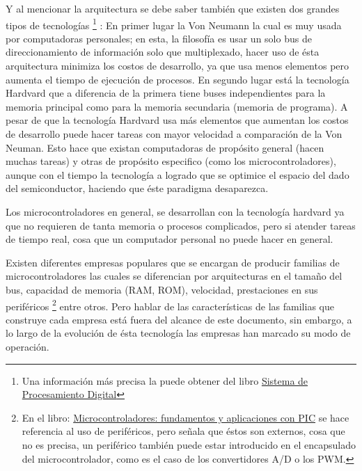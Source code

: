 \documentclass{article}
\begin{document}
Y al mencionar la arquitectura se debe saber también que existen dos
grandes tipos de tecnologías \footnote{Una información más precisa la puede
		obtener del libro \href{https://books.google.com.co/books?id=N7u2x4LyJ7UC\&pg=PA8\&dq=harvard+von+neumann\&hl=es-419\&sa=X\&ved=0ahUKEwjCrOKkus_LAhVCQSYKHVBGB8gQ6AEIHTAA\#v=onepage\&q=harvard\%20von\%20neumann\&f=false}{Sistema de Procesamiento Digital}} 
: En primer lugar la Von Neumann la cual es muy
usada por computadoras personales; en esta, la filosofía es usar un solo bus
de direccionamiento de información solo que multiplexado, hacer uso de ésta
arquitectura minimiza los costos de desarrollo, ya que usa menos elementos
pero aumenta el tiempo de ejecución de procesos. En segundo lugar está
la tecnología Hardvard que a diferencia de la primera tiene buses 
independientes para la memoria principal como para la memoria secundaria
(memoria de programa). A pesar de que la tecnología Hardvard usa más
elementos que aumentan los costos de desarrollo puede hacer tareas con
mayor velocidad a comparación de la Von Neuman. Esto hace que existan
computadoras de propósito general (hacen muchas tareas) y otras de
propósito especifico (como los microcontroladores), aunque con el tiempo la
tecnología a logrado que se optimice el espacio del dado del semiconductor,
haciendo que éste paradigma desaparezca.

Los microcontroladores en general, se desarrollan con la tecnología hardvard
ya que no requieren de tanta memoria o procesos complicados, pero si atender
tareas de tiempo real, cosa que un computador personal no puede hacer en
general.

Existen diferentes empresas populares que se encargan de producir 
familias de microcontroladores las cuales se diferencian por arquitecturas
en el tamaño del bus, capacidad de memoria (RAM, ROM), velocidad, 
prestaciones en sus periféricos \footnote{En el libro: 
		\href{https://books.google.com.co/books?id=ODenKGOHMRkC\&pg=PA149i\&dq=perifericoi\&hl=es-419\&sa=X\&redir_esc=y\#v=onepage\&q=peroperiferico\&f=false}
{Microcontroladores: fundamentos y aplicaciones con PIC} se hace referencia
al uso de periféricos, pero señala que éstos son externos, cosa que no es 
precisa, un periférico también puede estar introducido en el encapsulado 
del microcontrolador, como es el caso
de los convertidores A/D o los PWM.} entre otros. Pero hablar de las
características de las familias que construye cada empresa está fuera
del alcance de este documento, sin embargo, a lo largo de la evolución de
ésta tecnología las empresas han marcado su modo de operación.
\end{document}
